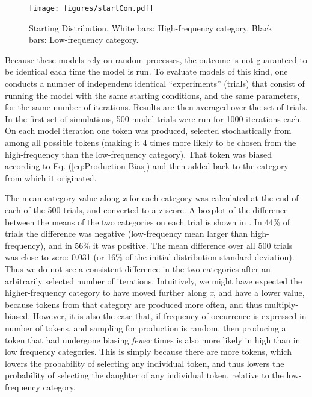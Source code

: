 \begin{figure}[H]

\centering{}\texttt{[image: figures/startCon.pdf]}\caption{\label{fig:Frequency Starting Dist}Starting Distribution. White bars:
High-frequency category. Black bars: Low-frequency category. }
\end{figure}

Because these models rely on random processes, the outcome is not
guaranteed to be identical each time the model is run. To evaluate
models of this kind, one conducts a number of independent identical
``experiments'' (trials) that consist of running the model with the
same starting conditions, and the same parameters, for the same number
of iterations. Results are then averaged over the set of trials. In
the first set of simulations, 500 model trials were run for 1000 iterations
each. On each model iteration one token was produced, selected stochastically
from among all possible tokens (making it 4 times more likely to be
chosen from the high-frequency than the low-frequency category). That
token was biased according to Eq. (\ref{eq:Production Bias}) and
then added back to the category from which it originated. 

The mean category value along \emph{x} for each category was calculated
at the end of each of the 500 trials, and converted to a z-score.
A boxplot of the difference between the means of the two categories
on each trial is shown in . In 44\% of trials the
difference was negative (low-frequency mean larger than high-frequency),
and in 56\% it was positive. The mean difference over all 500 trials
was close to zero: 0.031 (or 16\% of the initial distribution standard
deviation). Thus we do not see a consistent difference in the two
categories after an arbitrarily selected number of iterations. Intuitively,
we might have expected the higher-frequency category to have moved
further along \emph{x}, and have a lower value, because tokens from
that category are produced more often, and thus multiply-biased.
However, it is also the case that, if frequency of occurrence is expressed
in number of tokens, and sampling for production is random, then producing
a token that had undergone biasing \emph{fewer} times is also more
likely in high than in low frequency categories. This is simply because
there are more tokens, which lowers the probability of selecting any
individual token, and thus lowers the probability of selecting the
daughter of any individual token, relative to the low-frequency category. 

